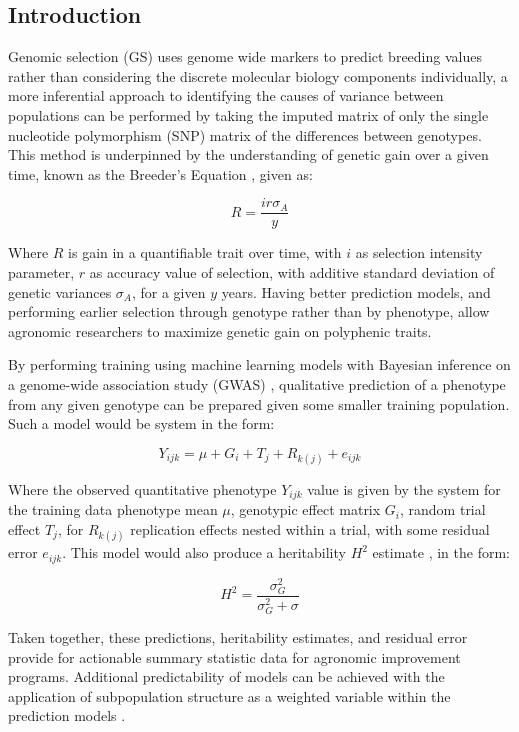 \documentclass[12pt, letterpaper,oneocolumn]{article}
\begin{document}
	\subsection{Introduction}
	Genomic selection (GS) uses genome wide markers to predict breeding values \cite{gwas} rather than considering the discrete molecular biology components individually, a more inferential approach to identifying the causes of variance between populations can be performed by taking the imputed matrix of only the single nucleotide polymorphism (SNP) matrix of the differences between genotypes. This method is underpinned by the understanding of genetic gain over a given time, known as the Breeder's Equation \cite{lush2013animal}, given as:

	$$R=\frac{ir\sigma_{A}}{y}$$

	Where $R$ is gain in a quantifiable trait over time, with $i$ as selection intensity parameter, $r$ as accuracy value of selection, with additive standard deviation of genetic variances $\sigma_{A}$, for a given $y$ years. Having better prediction models, and performing earlier selection through genotype rather than by phenotype, allow agronomic researchers to maximize genetic gain on polyphenic traits.

	By performing training using machine learning models with Bayesian inference on a genome-wide association study (GWAS) \cite{Poland2015}, qualitative prediction of a phenotype from any given genotype can be prepared given some smaller training population. Such a model would be system in the form:

	$$Y_{ijk} = \mu + G_i + T_j + R_{k(j)} + e_{ijk}$$

	Where the observed quantitative phenotype $Y_{ijk}$ value is given by the system for the training data phenotype mean $\mu$, genotypic effect matrix $G_{i}$, random trial effect $T_{j}$, for $R_{k(j)}$ replication effects nested within a trial, with some residual error $e_{ijk}$. This model would also produce a heritability $H^2$ estimate \cite{Poland2015}, in the form:

	$$H^2 = \frac{\sigma^2_G}{\sigma^2_G + \sigma}$$

	Taken together, these predictions, heritability estimates, and residual error provide for actionable summary statistic data for agronomic improvement programs. Additional predictability of models can be achieved with the application of subpopulation structure as a weighted variable within the prediction models \cite{Soysubpop}.
\end{document}
